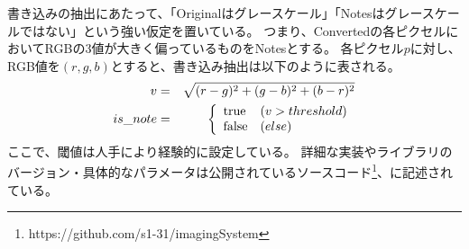 \documentclass[a4paper, dvipdfmx]{jarticle}
\begin{document}
書き込みの抽出にあたって、「Originalはグレースケール」「Notesはグレースケールではない」という強い仮定を置いている。
つまり、Convertedの各ピクセルにおいてRGBの3値が大きく偏っているものをNotesとする。
各ピクセル$p$に対し、RGB値を$(r, g, b)$とすると、書き込み抽出は以下のように表される。
\begin{eqnarray}
    v & = & \sqrt{(r-g)^2+(g-b)^2+(b-r)^2}\\
    is\_note & = & \left\{ \begin{array}{ll}
            {\rm true} & (v > threshold) \\
            {\rm false} & (else) \\
        \end{array} \right.
\end{eqnarray}
ここで、閾値は人手により経験的に設定している。
詳細な実装やライブラリのバージョン・具体的なパラメータは公開されているソースコード\footnote{https://github.com/s1-31/imagingSystem}、に記述されている。
\end{document}
